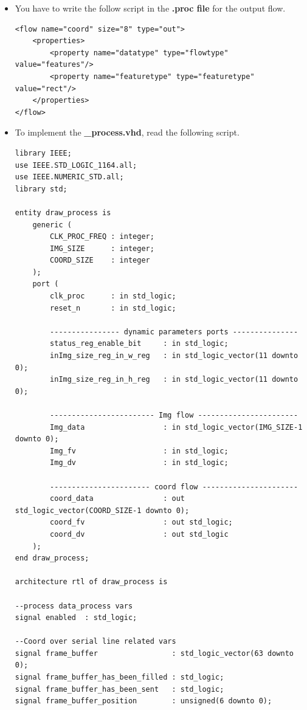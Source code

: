 \documentclass[12pt,a4paper]{article}
\begin{document}
\begin{itemize}
\item You have to write the follow script in the \textbf{.proc file} for the output flow.\\

\lstset{language=XML}
\begin{lstlisting}
<flow name="coord" size="8" type="out">
    <properties>
    	<property name="datatype" type="flowtype" value="features"/>
        <property name="featuretype" type="featuretype" value="rect"/>
    </properties>
</flow>
\end{lstlisting}

\vspace{2.25cm}

\item To implement the \textbf{\_process.vhd}, read the following script.\\ 

\begin{lstlisting}[style=vhdl]
library IEEE;
use IEEE.STD_LOGIC_1164.all;
use IEEE.NUMERIC_STD.all;
library std;

entity draw_process is
	generic (
	    CLK_PROC_FREQ : integer;
	    IMG_SIZE      : integer;
	    COORD_SIZE    : integer
	);
	port (
	    clk_proc      : in std_logic;
	    reset_n       : in std_logic;
	    
	    ---------------- dynamic parameters ports ---------------
	    status_reg_enable_bit     : in std_logic;
	    inImg_size_reg_in_w_reg   : in std_logic_vector(11 downto 0);
	    inImg_size_reg_in_h_reg   : in std_logic_vector(11 downto 0);
	    
	    ------------------------ Img flow -----------------------
	    Img_data                  : in std_logic_vector(IMG_SIZE-1 downto 0);
	    Img_fv                    : in std_logic;
	    Img_dv                    : in std_logic;
	    
	    ----------------------- coord flow ----------------------
	    coord_data                : out std_logic_vector(COORD_SIZE-1 downto 0);
	    coord_fv                  : out std_logic;
	    coord_dv                  : out std_logic
	);
end draw_process;

architecture rtl of draw_process is

--process data_process vars
signal enabled  : std_logic;

--Coord over serial line related vars
signal frame_buffer                 : std_logic_vector(63 downto 0);
signal frame_buffer_has_been_filled : std_logic;
signal frame_buffer_has_been_sent   : std_logic;
signal frame_buffer_position        : unsigned(6 downto 0);


\end{lstlisting}
\end{itemize}
\end{document}
